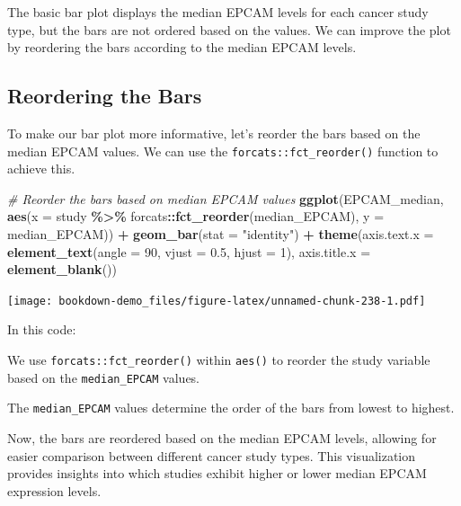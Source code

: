 \documentclass[
]{book}
\newenvironment{Shaded}{\begin{snugshade}}{\end{snugshade}}
\newcommand{\AttributeTok}[1]{\textcolor[rgb]{0.13,0.29,0.53}{#1}}
\newcommand{\CommentTok}[1]{\textcolor[rgb]{0.56,0.35,0.01}{\textit{#1}}}
\newcommand{\DecValTok}[1]{\textcolor[rgb]{0.00,0.00,0.81}{#1}}
\newcommand{\FloatTok}[1]{\textcolor[rgb]{0.00,0.00,0.81}{#1}}
\newcommand{\FunctionTok}[1]{\textcolor[rgb]{0.13,0.29,0.53}{\textbf{#1}}}
\newcommand{\NormalTok}[1]{#1}
\newcommand{\SpecialCharTok}[1]{\textcolor[rgb]{0.81,0.36,0.00}{\textbf{#1}}}
\newcommand{\StringTok}[1]{\textcolor[rgb]{0.31,0.60,0.02}{#1}}
\begin{document}
The basic bar plot displays the median EPCAM levels for each cancer study type, but the bars are not ordered based on the values. We can improve the plot by reordering the bars according to the median EPCAM levels.

\hypertarget{reordering-the-bars}{%
\subsection{Reordering the Bars}\label{reordering-the-bars}}

To make our bar plot more informative, let's reorder the bars based on the median EPCAM values. We can use the \texttt{forcats::fct\_reorder()} function to achieve this.

\begin{Shaded}
\begin{Highlighting}[]
\CommentTok{\# Reorder the bars based on median EPCAM values}
\FunctionTok{ggplot}\NormalTok{(EPCAM\_median, }\FunctionTok{aes}\NormalTok{(}\AttributeTok{x =}\NormalTok{ study }\SpecialCharTok{\%\textgreater{}\%}
\NormalTok{                           forcats}\SpecialCharTok{::}\FunctionTok{fct\_reorder}\NormalTok{(median\_EPCAM), }
                         \AttributeTok{y =}\NormalTok{ median\_EPCAM)) }\SpecialCharTok{+}
  \FunctionTok{geom\_bar}\NormalTok{(}\AttributeTok{stat =} \StringTok{"identity"}\NormalTok{) }\SpecialCharTok{+}
  \FunctionTok{theme}\NormalTok{(}\AttributeTok{axis.text.x =} \FunctionTok{element\_text}\NormalTok{(}\AttributeTok{angle =} \DecValTok{90}\NormalTok{, }\AttributeTok{vjust =} \FloatTok{0.5}\NormalTok{, }\AttributeTok{hjust =} \DecValTok{1}\NormalTok{),}
        \AttributeTok{axis.title.x =} \FunctionTok{element\_blank}\NormalTok{())}
\end{Highlighting}
\end{Shaded}

\texttt{[image: bookdown-demo\_files/figure-latex/unnamed-chunk-238-1.pdf]}

In this code:

We use \texttt{forcats::fct\_reorder()} within \texttt{aes()} to reorder the study variable based on the \texttt{median\_EPCAM} values.

The \texttt{median\_EPCAM} values determine the order of the bars from lowest to highest.

Now, the bars are reordered based on the median EPCAM levels, allowing for easier comparison between different cancer study types. This visualization provides insights into which studies exhibit higher or lower median EPCAM expression levels.
\end{document}
